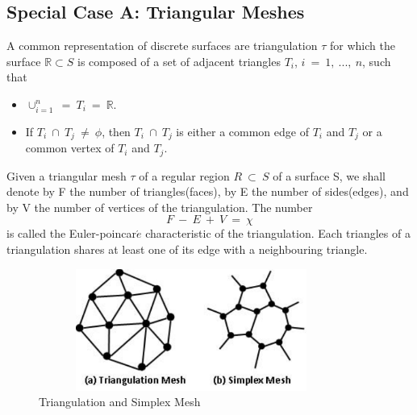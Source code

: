 \documentclass{InsightArticle}
\begin{document}
\subsection{Special Case A: Triangular Meshes}
A common representation of discrete surfaces are triangulation $\tau$ for which the surface $\mathbb{R} \subset S$ is composed of a set of adjacent triangles $T_i$, $i~=~1,~... ,~n$, such that 
\begin{itemize}
	\item $\cup_{i=1}^n~=~T_i~=~\mathbb{R}$.
	\item If $T_i~\cap~T_j~\neq~\phi$, then $T_i~\cap~T_j$ is either a common edge of $T_i$ and $T_j$ or a common vertex of $T_i$ and $T_j$. 
\end{itemize}
Given a triangular mesh $\tau$ of a regular region $R~\subset~S$ of a surface S, we shall denote by F the number of triangles(faces), by E the number of sides(edges), and by V the number of vertices of the triangulation. The number 
\begin{equation}
F~-~E~+~V~=~\chi
\end{equation}
is called the Euler-poincar$\acute{e}$ characteristic of the triangulation.
Each triangles of a triangulation shares at least one of its edge with a neighbouring triangle.
\begin{figure}[!t]
	\centering
	\includegraphics[width=100mm, height=40mm]{TriangulationSimplexMesh}
	\caption{Triangulation and Simplex Mesh}
	\label{fig:triangulationSimplexMesh}
\end{figure}
\end{document}

